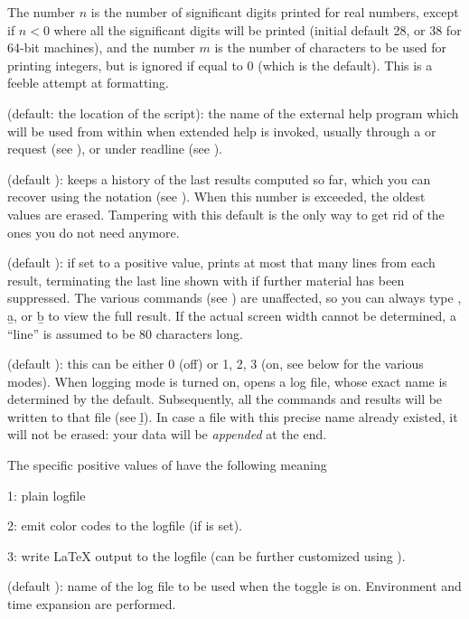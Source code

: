 The number $n$ is the number of significant digits printed for real
numbers, except if $n<0$ where all the significant digits will be printed
(initial default 28, or 38 for 64-bit machines), and the number $m$ is the
number of characters to be used for printing integers, but is ignored if
equal to 0 (which is the default). This is a feeble attempt at formatting.

 (default: the location of the  script): the
name of the external help program which will be used from within  when
extended help is invoked, usually through a  or  request
(see ), or  under readline (see
).

 (default ):  keeps a history of the last
 results computed so far, which you can recover using the
\kbd{\%} notation (see ). When this number is exceeded,
the oldest values are erased. Tampering with this default is the only way to
get rid of the ones you do not need anymore.

 (default ): if set to a positive value,  prints at
most that many lines from each result, terminating the last line shown with
\kbd{[+++]} if further material has been suppressed. The various 
commands (see ) are unaffected, so you can always type
, \b{a}, or \b{b} to view the full result. If the actual
screen width cannot be determined, a ``line'' is assumed to be 80 characters
long.

 (default ): this can be either 0 (off) or 1, 2, 3
(on, see below for the various modes). When logging mode is turned on,
opens a log file, whose exact name is determined by the 
default. Subsequently, all the commands and results will be written to that
file (see \b{l}). In case a file with this precise name already existed, it
will not be erased: your data will be \emph{appended} at the end.

The specific positive values of  have the following meaning

1: plain logfile

2: emit color codes to the logfile (if  is set).

3: write LaTeX output to the logfile (can be further customized using
).

 (default ): name of the log file to be
used when the  toggle is on. Environment and time expansion are
performed.

